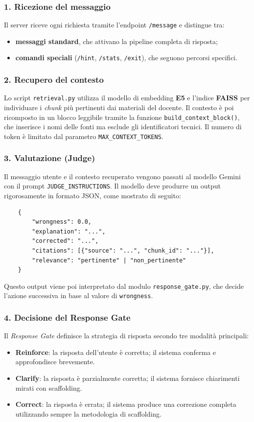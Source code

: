 \documentclass[a4paper,9pt]{article}
\begin{document}
\subsubsection{1. Ricezione del messaggio}
Il server riceve ogni richiesta tramite l'endpoint \texttt{/message} e distingue tra:
\begin{itemize}
	\item \textbf{messaggi standard}, che attivano la pipeline completa di risposta;
	\item \textbf{comandi speciali} (\texttt{/hint}, \texttt{/stats}, \texttt{/exit}), che seguono percorsi specifici.
\end{itemize}

\subsubsection{2. Recupero del contesto }
Lo script \texttt{retrieval.py} utilizza il modello di embedding \textbf{E5} e l'indice \textbf{FAISS} per individuare i \textit{chunk} più pertinenti dai materiali del docente. 
Il contesto è poi ricomposto in un blocco leggibile tramite la funzione \texttt{build\_context\_block()}, che inserisce i nomi delle fonti ma esclude gli identificatori tecnici. Il numero di token è limitato dal parametro \texttt{MAX\_CONTEXT\_TOKENS}.

\subsubsection{3. Valutazione (Judge)}
Il messaggio utente e il contesto recuperato vengono passati al modello Gemini con il prompt \texttt{JUDGE\_INSTRUCTIONS}. 
Il modello deve produrre un output rigorosamente in formato JSON, come mostrato di seguito:
\begin{verbatim}
	{
		"wrongness": 0.0,
		"explanation": "...",
		"corrected": "...",
		"citations": [{"source": "...", "chunk_id": "..."}],
		"relevance": "pertinente" | "non_pertinente"
	}
\end{verbatim}

Questo output viene poi interpretato dal modulo \texttt{response\_gate.py}, che decide l'azione successiva in base al valore di \texttt{wrongness}.

\subsubsection{4. Decisione del Response Gate}
Il \textit{Response Gate} definisce la strategia di risposta secondo tre modalità principali:
\begin{itemize}
	\item \textbf{Reinforce}: la risposta dell'utente è corretta; il sistema conferma e approfondisce brevemente.
	\item \textbf{Clarify}: la risposta è parzialmente corretta; il sistema fornisce chiarimenti mirati con scaffolding.
	\item \textbf{Correct}: la risposta è errata; il sistema produce una correzione completa utilizzando sempre la metodologia di scaffolding.
\end{itemize}
\end{document}
